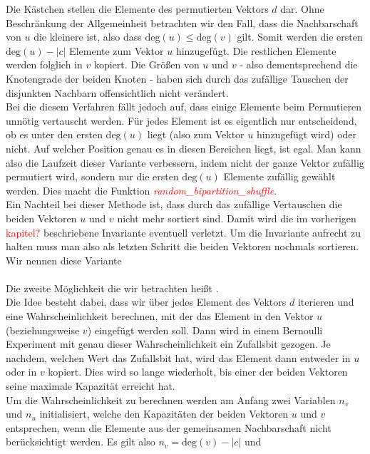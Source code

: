 Die Kästchen stellen die Elemente des permutierten Vektors $d$ dar. Ohne Beschränkung der
Allgemeinheit betrachten wir den Fall, dass die Nachbarschaft von $u$ die kleinere ist, also dass 
$\text{deg}(u) \le \text{deg}(v)$ gilt. Somit werden die ersten $\text{deg}(u)-|c|$ Elemente zum 
Vektor $u$ hinzugefügt. Die restlichen
Elemente werden folglich in $v$ kopiert.
Die Größen von $u$ und $v$ - also dementsprechend die Knotengrade der beiden Knoten - haben sich durch das
zufällige Tauschen der disjunkten Nachbarn offensichtlich
nicht verändert.
\\
Bei die diesem Verfahren fällt  jedoch auf, dass einige Elemente beim Permutieren unnötig vertauscht werden.
Für jedes Element ist es eigentlich nur entscheidend, ob es unter den ersten $\text{deg}(u)$  liegt (also zum Vektor
$u$ hinzugefügt wird) oder nicht. Auf welcher Position genau es in diesen Bereichen liegt, ist egal. Man
kann also die Laufzeit dieser Variante verbessern, indem nicht der ganze Vektor zufällig permutiert 
wird, sondern nur die ersten $\text{deg}(u)$ Elemente zufällig gewählt werden. Dies macht die Funktion 
\textcolor{red}{\textit{random\_bipartition\_shuffle}}.
\\
Ein Nachteil bei dieser Methode ist, dass durch das zufällige Vertauschen die beiden Vektoren
$u$ und $v$ nicht mehr sortiert sind. Damit wird die im vorherigen \textcolor{red}{kapitel?} beschriebene
Invariante eventuell verletzt. Um die Invariante aufrecht zu halten muss man also als letzten Schritt
die beiden Vektoren nochmals sortieren.
Wir nennen diese Variante \perm
\\
\\
Die zweite Möglichkeit die wir betrachten heißt \distr.
\\
Die Idee besteht dabei, dass wir über jedes Element des Vektors $d$ iterieren und eine Wahrscheinlichkeit
berechnen, mit
der das Element in den Vektor $u$ (beziehungsweise $v$) eingefügt werden soll. Dann wird in einem 
Bernoulli Experiment mit genau dieser Wahrscheinlichkeit ein Zufallsbit gezogen. Je nachdem, welchen
Wert das Zufallsbit hat, wird das Element dann entweder in $u$ oder in $v$ kopiert. Dies wird so lange
wiederholt, bis einer der beiden Vektoren seine maximale Kapazität erreicht hat. 
\\
Um die Wahrscheinlichkeit zu berechnen werden am Anfang zwei Variablen $n_v$ und $n_u$ initialisiert, 
welche den Kapazitäten der beiden Vektoren $u$ und $v$ entsprechen, wenn die Elemente aus der 
gemeinsamen Nachbarschaft nicht berücksichtigt werden. Es gilt also $n_v = \text{deg}(v) - |c|$ und
